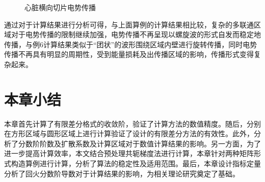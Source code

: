 \documentclass[twoside,UTF8]{nputhesis}
\begin{document}
\begin{figure}[htbp]
{\begin{minipage}{4cm}
		\end{minipage}
	}

	\setlength{\abovecaptionskip}{-0.2cm} %
	\caption{心脏横向切片电势传播}
	\label{fig:1a}
	\vspace{-0.5cm} %
	
\end{figure}


通过对于计算结果进行分析可得，与上面算例的计算结果相比较，复杂的多联通区域对于电势传播的限制继续加强，电势传播不再呈现以螺旋波的形式自发而稳定地传播，与例6计算结果类似于“团状”的波形围绕区域内壁进行旋转传播，同时电势传播不再具有明显的周期性，受到能量损耗及出传播区域的影响，传播形式变得复杂起来。
\section{本章小结}
本章首先计算了有限差分格式的收敛阶，验证了计算方法的数值精度。随后，分别在方形区域与圆形区域上进行计算验证了设计的有限差分方法的有效性。此外，分析了分数阶阶数及扩散系数及计算区域对于数值计算结果的影响。另一方面，为了进一步提高计算效率，本文结合预处理共轭梯度法进行计算，本章针对两种矩阵形式构造算例进行计算，分析了算法的稳定性及适用范围。最后，本章设计指标定量分析了回火分数阶导数对于计算结果的影响，为相关理论研究奠定了基础。
\end{document}
